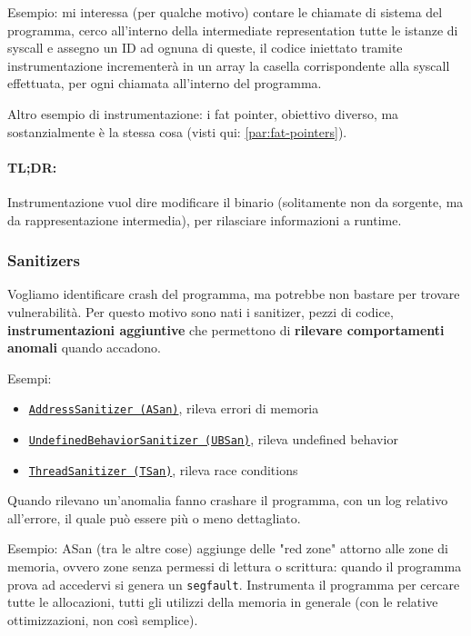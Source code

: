 Esempio: mi interessa (per qualche motivo) contare le chiamate di sistema del programma, cerco all'interno della intermediate representation tutte le istanze di syscall e assegno un ID ad ognuna di queste, il codice iniettato tramite instrumentazione incrementerà in un array la casella corrispondente alla syscall effettuata, per ogni chiamata all'interno del programma. 

Altro esempio di instrumentazione: i fat pointer, obiettivo diverso, ma sostanzialmente è la stessa cosa (visti qui: \ref{par:fat-pointers}). 

\paragraph{TL;DR:} Instrumentazione vuol dire modificare il binario (solitamente non da sorgente, ma da rappresentazione intermedia), per rilasciare informazioni a runtime.

\subsubsection{Sanitizers}

Vogliamo identificare crash del programma, ma potrebbe non bastare per trovare vulnerabilità. Per questo motivo sono nati i sanitizer, pezzi di codice, \textbf{instrumentazioni aggiuntive} che permettono di \textbf{rilevare comportamenti anomali} quando accadono. 

Esempi: 
\begin{itemize}
	\item \href{https://github.com/google/sanitizers/wiki/addresssanitizer}{\texttt{AddressSanitizer (ASan)}}, rileva errori di memoria

	\item \href{https://docs.kernel.org/dev-tools/ubsan.html}{\texttt{UndefinedBehaviorSanitizer (UBSan)}}, rileva undefined behavior

	\item \href{https://github.com/google/sanitizers/wiki/threadsanitizercppmanual}{\texttt{ThreadSanitizer (TSan)}}, rileva race conditions
\end{itemize}

Quando rilevano un'anomalia fanno crashare il programma, con un log relativo all'errore, il quale può essere più o meno dettagliato.

Esempio: ASan (tra le altre cose) aggiunge delle "red zone" attorno alle zone di memoria, ovvero zone senza permessi di lettura o scrittura: quando il programma prova ad accedervi si genera un \texttt{segfault}. Instrumenta il programma per cercare tutte le allocazioni, tutti gli utilizzi della memoria in generale (con le relative ottimizzazioni, non così semplice).

